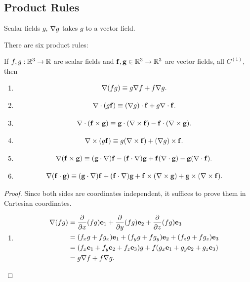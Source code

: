 \documentclass[10pt, a4paper]{article}
\begin{document}
\subsection{Product Rules}
Scalar fields $g$,
$\mathbf{\nabla} g$ takes $g$ to a vector field.

There are six product rules:
\begin{proposition}\label{mathmethII:prop:prodrules}
    If $f, g : \mathbb{R} ^ 3 \to \mathbb{R}$ are scalar fields and $\mathbf{f}, \mathbf{g} \in \mathbb{R} ^ 3 \to \mathbb{R} ^ 3$ are vector fields,
    all $C ^ {(1)}$,
    then
    \begin{enumerate}[label = (\arabic*)]
        \item
        \[
        \mathbf{\nabla}(fg) \equiv g\mathbf{\nabla} f + f\mathbf{\nabla} g.
        \]

        \item
        \[
        \mathbf{\nabla} \cdot (g\mathbf{f}) \equiv (\mathbf{\nabla} g) \cdot \mathbf{f} + g\mathbf{\nabla} \cdot \mathbf{f}.
        \]

        \item
        \[
        \mathbf{\nabla} \cdot (\mathbf{f} \times \mathbf{g}) \equiv \mathbf{g} \cdot (\mathbf{\nabla} \times \mathbf{f}) - \mathbf{f} \cdot (\mathbf{\nabla} \times \mathbf{g}).
        \]

        \item
        \[
        \mathbf{\nabla} \times (g\mathbf{f}) \equiv g(\mathbf{\nabla} \times \mathbf{f}) + (\mathbf{\nabla} g)\times \mathbf{f}.
        \]

        \item
        \[
        \mathbf{\nabla} (\mathbf{f} \times \mathbf{g}) \equiv (\mathbf{g} \cdot \mathbf{\nabla})\mathbf{f} - (\mathbf{f}\cdot\mathbf{\nabla})\mathbf{g} + \mathbf{f}(\mathbf{\nabla} \cdot\mathbf{g}) - \mathbf{g}(\mathbf{\nabla} \cdot \mathbf{f}).
        \]

        \item
        \[
        \mathbf{\nabla}(\mathbf{f} \cdot \mathbf{g}) \equiv (\mathbf{g}\cdot\mathbf{\nabla})\mathbf{f} + (\mathbf{f}\cdot\mathbf{\nabla})\mathbf{g} + \mathbf{f}\times(\mathbf{\nabla} \times \mathbf{g}) + \mathbf{g} \times (\mathbf{\nabla} \times \mathbf{f}).
        \]
    \end{enumerate}

    \begin{proof}
        Since both sides are coordinates independent,
        it suffices to prove them in Cartesian coordinates.
        
        \begin{enumerate}[label = (\arabic*)]
            \item
            \begin{align*}
                \mathbf{\nabla}(fg) &= \frac{\partial }{\partial x}(fg)\mathbf{e}_1 + \frac{\partial }{\partial y}(fg)\mathbf{e}_2 + \frac{\partial }{\partial z}(fg)\mathbf{e}_3 \\
                &= (f_xg + fg_x)\mathbf{e}_1 + (f_yg + fg_y)\mathbf{e}_2 + (f_zg + fg_z)\mathbf{e}_3 \\
                &= (f_x\mathbf{e}_1 + f_y\mathbf{e}_2 + f_z\mathbf{e}_3)g + f(g_x\mathbf{e}_1 + g_y\mathbf{e}_2 + g_z\mathbf{e}_3) \\
                &= g\mathbf{\nabla} f + f\mathbf{\nabla} g.
            \end{align*}


\end{enumerate}
\end{proof}
\end{proposition}
\end{document}
